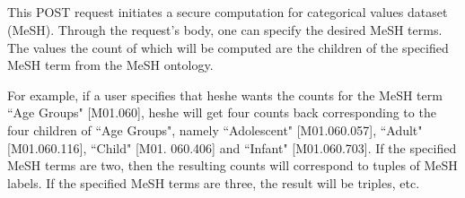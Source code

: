 \subsection[/smpc/histogram/categorical POST request]{\protect{}}\label{s:post2}
This POST request initiates a secure computation for categorical values dataset (MeSH).
Through the request's body, one can specify the desired MeSH terms.
The values the count of which will be computed are the children of the specified MeSH term from the MeSH ontology.

For example, if a user specifies that he\myslash she wants the counts for the MeSH term ``Age Groups" [M01.060], he\myslash she will get four counts back corresponding to the four children of ``Age Groups", namely ``Adolescent" [M01.060.057], ``Adult" [M01.060.116], ``Child" [M01. 060.406] and ``Infant" [M01.060.703].
If the specified MeSH terms are two, then the resulting counts will correspond to tuples of MeSH labels.
If the specified MeSH terms are three, the result will be triples, etc.


